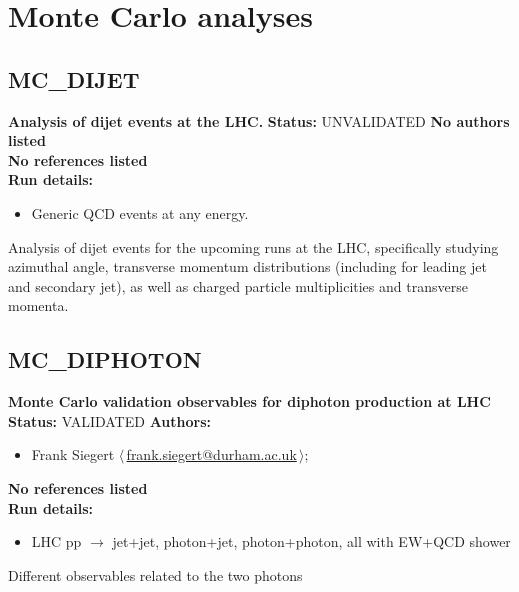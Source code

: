 \section{Monte Carlo analyses}
\subsection{MC\_DIJET}
\textbf{Analysis of dijet events at the LHC.}\newline
\textbf{Status:} UNVALIDATED\newline
\textbf{No authors listed}\\ 
\textbf{No references listed}\\ 
\textbf{Run details:}
\begin{itemize}

  \item Generic QCD events at any energy.\end{itemize}

\noindent Analysis of dijet events for the upcoming runs at the LHC, specifically studying azimuthal angle, transverse momentum distributions (including for leading jet and secondary jet), as well as charged particle multiplicities and transverse momenta.

\clearpage


\clearpage

\subsection{MC\_DIPHOTON}
\textbf{Monte Carlo validation observables for diphoton production at LHC}\newline
\textbf{Status:} VALIDATED\newline
\textbf{Authors:}
\begin{itemize}
  \item Frank Siegert $\langle\,$\href{mailto:frank.siegert@durham.ac.uk}{frank.siegert@durham.ac.uk}$\,\rangle$;
\end{itemize}
\textbf{No references listed}\\ 
\textbf{Run details:}
\begin{itemize}

  \item LHC pp \ensuremath{\to} jet+jet, photon+jet, photon+photon, all with EW+QCD shower\end{itemize}

\noindent Different observables related to the two photons

